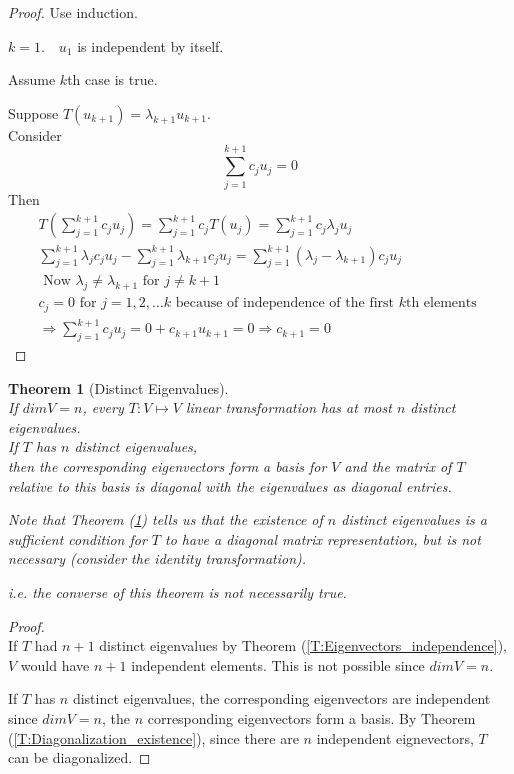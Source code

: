\documentclass[twoside]{amsart}
\theoremstyle{plain}
\newtheorem{theorem}{Theorem}
\theoremstyle{definition}
\begin{document}
\begin{proof}
Use induction.  

$k=1. \quad u_1$ is independent by itself.  

Assume $k$th case is true.  

Suppose $T(u_{k+1}) = \lambda_{k+1}u_{k+1}$.  \\
Consider
\[
\sum_{j=1}^{k+1} c_j u_j = 0  
\]
Then
\begin{gather*}
T \left( \sum_{j=1}^{k+1} c_j u_j \right) = \sum_{j=1}^{k+1} c_j T(u_j) = \sum_{j=1}^{k+1} c_j \lambda_j u_j \\
\sum_{j=1}^{k+1} \lambda_j c_j u_j - \sum_{j=1}^{k+1} \lambda_{k+1} c_j u_j = \sum_{j=1}^{k+1} (\lambda_j - \lambda_{k+1} ) c_j u_j  \\
\text{ Now } \lambda_j \neq \lambda_{k+1} \text{ for } j \neq k+1 \\
c_j = 0 \text{ for } j =1,2,\dots k \text{ because of independence of the first $k$th elements }\\
\Longrightarrow \sum_{j=1}^{k+1} c_j u_j = 0 + c_{k+1}u_{k+1} = 0 \Longrightarrow c_{k+1} = 0 
\end{gather*}
\end{proof}

\begin{theorem}[Distinct Eigenvalues]\label{T:Distinct_Eigenvalues} \quad \\
If $dim V = n$, every $T:V \mapsto V$ linear transformation has at most $n$ distinct eigenvalues.  \\
If $T$ has $n$ distinct eigenvalues, \\
\phantom{If} then the corresponding eigenvectors form a basis for $V$ and the matrix of $T$ relative to this basis is diagonal with the eigenvalues as diagonal entries.  

Note that Theorem (\ref{T:Distinct_Eigenvalues}) tells us that the existence of $n$ distinct eigenvalues is a sufficient condition for $T$ to have a diagonal matrix representation, but is not necessary (consider the identity transformation).  

i.e. the converse of this theorem is not necessarily true.  
\end{theorem}

\begin{proof} \quad \\
If $T$ had $n+1$ distinct eigenvalues by Theorem (\ref{T:Eigenvectors_independence}), $V$ would have $n+1$ independent elements.  This is not possible since $dim V = n$.  

If $T$ has $n$ distinct eigenvalues, the corresponding eigenvectors are independent since $dim V = n$, the $n$ corresponding eigenvectors form a basis.  By Theorem (\ref{T:Diagonalization_existence}), since there are $n$ independent eignevectors, $T$ can be diagonalized.  
\end{proof}
\end{document}
